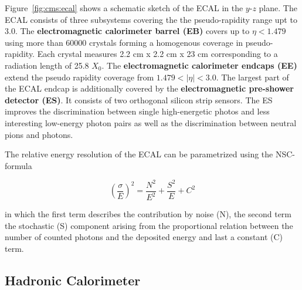 Figure~\ref{fig:cms:ecal} shows a schematic sketch of the ECAL in the $y$-$z$
plane. The ECAL consists of three subsystems covering the the pseudo-rapidity
range upt to 3.0. The \textbf{electromagnetic calorimeter barrel (EB)} covers up
to $\eta < 1.479$ using more than 60000 crystals forming a homogenous coverage
in pseudo-rapidity. Each crystal measures 2.2 cm x 2.2 cm x 23 cm corresponding
to a radiation length of 25.8 $X_0$. The \textbf{electromagnetic calorimeter
endcaps (EE)} extend the pseudo rapidity coverage from $1.479 < |\eta| < 3.0$.
The largest part of the ECAL endcap is additionally covered by the
\textbf{electromagnetic pre-shower detector (ES)}. It consists of two orthogonal
silicon strip sensors. The ES improves the discrimination between single
high-energetic photos and less interesting low-energy photon pairs as well as
the discrimination between neutral pions and photons.

The relative energy resolution of the ECAL can be parametrized using the NSC-formula

\begin{equation}
    \left( \frac{\sigma}{E} \right)^2 = \frac{N^2}{E^2} + \frac{S^2}{E} + C^2
\end{equation}

in which the first term describes the contribution by noise (N), the second
term the stochastic (S) component arising from the proportional relation between
the number of counted photons and the deposited energy and last a constant (C)
term.

\subsection{Hadronic Calorimeter}

